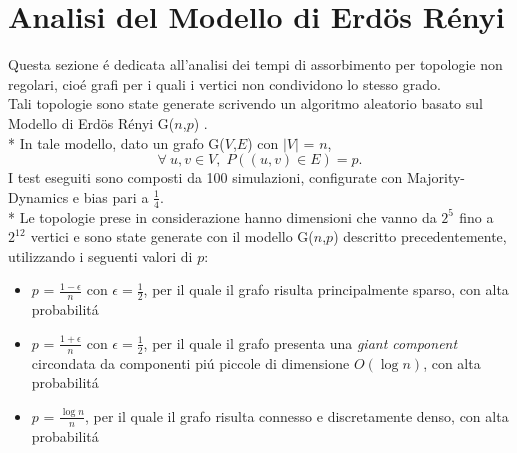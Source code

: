 \documentclass[../Tesi.tex]{subfiles}
\begin{document}
\section{Analisi del Modello di Erd{\"o}s R\'enyi}
Questa sezione \'e dedicata all'analisi dei tempi di assorbimento per topologie non regolari, cio\'e grafi per i quali i vertici non condividono lo stesso grado.\\
Tali topologie sono state generate scrivendo un algoritmo aleatorio basato sul Modello di Erd{\"o}s R\'enyi G($n$,$p$) \cite{Erdos:1959:pmd}.\\*
In tale modello, dato un grafo G($V$,$E$) con $|V|$ = $n$,
\begin{equation}
    \forall \: u,v \in V,\; P((u,v) \in E)=p.
\end{equation}
I test eseguiti sono composti da 100 simulazioni, configurate con Majority-Dynamics e bias pari a $\frac{1}{4}$.\\*
Le topologie prese in considerazione hanno dimensioni che vanno da $2^{5^{\mathrm{}}}$ fino a $2^{12^{\mathrm{}}}$ vertici e sono state generate con il modello G($n$,$p$) descritto precedentemente, utilizzando i seguenti valori di $p$:
\begin{itemize}
\item $p$ = $\frac{1-\epsilon}{n}$ con $\epsilon=\frac{1}{2}$, per il quale il grafo risulta principalmente sparso, con alta probabilit\'a
\item $p$ = $\frac{1+\epsilon}{n}$ con $\epsilon=\frac{1}{2}$, per il quale il grafo presenta una \emph{giant component} circondata da componenti pi\'u piccole di dimensione $O(\log{}n)$, con alta probabilit\'a
\item $p$ = $\frac{\log{}n}{n}$, per il quale il grafo risulta connesso e discretamente denso, con alta probabilit\'a
\end{itemize}
\end{document}
